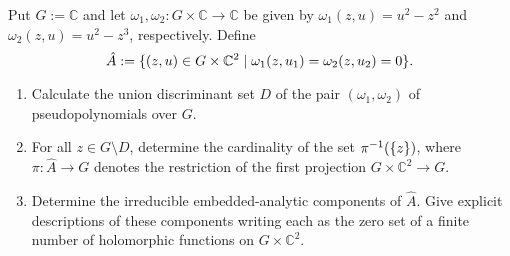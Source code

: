 \documentclass[a4paper]{amsart}
\newcommand{\C}{\mathbb{C}}
\theoremstyle{remark}
\numberwithin{equation}{question}
\DeclarePairedDelimiter\set{\{}{\}}
\begin{document}
\begin{question}
\label{qu:embedded-analytic}
Put $G := \C$ and let $\omega_1,\omega_2 \colon G \times \C \to \C$ be given by $\omega_1(z,u) = u^2 - z^2$ and $\omega_2(z,u) = u^2 - z^3$, respectively. Define
\[
\hat A := \set{(z,u) \in G \times \C^2 \mid \omega_1(z,u_1) = \omega_2(z,u_2) = 0}.
\]
\begin{enumerate}
\item Calculate the union discriminant set $D$ of the pair $(\omega_1,\omega_2)$ of pseudopolynomials over $G$.
\item For all $z \in G \setminus D$, determine the cardinality of the set $\pi^{-1}(\set z)$, where $\pi \colon \hat A \to G$ denotes the restriction of the first projection $G \times \C^2 \to G$.
\item Determine the irreducible embedded-analytic components of $\hat A$. Give explicit descriptions of these components writing each as the zero set of a finite number of holomorphic functions on $G \times \C^2$.
\end{enumerate}
\end{question}
\end{document}
